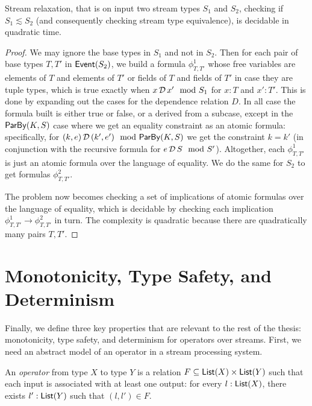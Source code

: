 \begin{theorem}
\label{thm:stream-relaxation-decidable}
Stream relaxation, that is on input two stream types $S_1$ and $S_2$, checking if $S_1 \lesssim S_2$ (and consequently checking stream type equivalence), is decidable in quadratic time.
\end{theorem}
\begin{proof}
We may ignore the base types in $S_1$ and not in $S_2$.
Then for each pair of base types $T, T'$ in $\mathsf{Event}(S_2)$,
we build a formula $\phi^1_{T, T'}$ whose free variables are elements of $T$ and elements of $T'$ or fields of $T$ and fields of $T'$ in case they are tuple types,
which is true exactly when
$x \,\mathcal{D}\, x' \mod {S_1}$ for $x : T$ and $x' : T'$.
This is done by expanding out the cases for the dependence relation $D$.
In all case the formula built is either true or false, or a derived from a subcase,
except in the $\mathsf{ParBy}({K}, S)$ case where
we get an equality constraint as an atomic formula:
specifically, for $(k, e) \,\mathcal{D}\, (k', e') \mod {\mathsf{ParBy}({K}, S)}$
we get the constraint $k = k'$ (in conjunction with the recursive formula for $e \,\mathcal{D}\, S \mod {S'}$).
Altogether, each $\phi^1_{T, T'}$ is just an atomic formula over the
language of equality.
We do the same for $S_2$ to get formulas $\phi^2_{T, T'}$.

The problem now becomes checking a set of implications
of atomic formulas over the language of equality, which is
decidable by checking each implication
$\phi^1_{T, T'} \to \phi^2_{T, T'}$
in turn.
The complexity is quadratic because there are quadratically many pairs $T, T'$.
\end{proof}

\section{Monotonicity, Type Safety, and Determinism}
\label{sec:operator-properties}

Finally, we define three key properties that are relevant to the rest of the thesis: monotonicity, type safety, and determinism for operators over streams.
First, we need an abstract model of an operator in a stream processing system.
\begin{definition}
\label{def:operator}
An \emph{operator} from type $X$ to type $Y$ is a relation
$F \subseteq \mathsf{List}(X) \times \mathsf{List}(Y)$ such that each input is associated with at least one output:
for every $l: \mathsf{List}(X)$, there exists $l': \mathsf{List}(Y)$
such that $(l, l') \in F$.
\end{definition}

